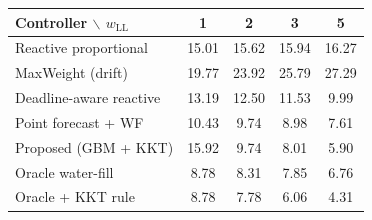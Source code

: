 \begin{tabular}{lcccc}
\hline
Controller $\backslash$ $w_{\mathrm{LL}}$ & 1 & 2 & 3 & 5 \\
\hline
Reactive proportional & 15.01 & 15.62 & 15.94 & 16.27 \\
MaxWeight (drift) & 19.77 & 23.92 & 25.79 & 27.29 \\
Deadline-aware reactive & 13.19 & 12.50 & 11.53 & 9.99 \\
Point forecast + WF & 10.43 & 9.74 & 8.98 & 7.61 \\
Proposed (GBM + KKT) & 15.92 & 9.74 & 8.01 & 5.90 \\
\hline
Oracle water-fill & 8.78 & 8.31 & 7.85 & 6.76 \\
Oracle + KKT rule & 8.78 & 7.78 & 6.06 & 4.31 \\
\hline
\end{tabular}
